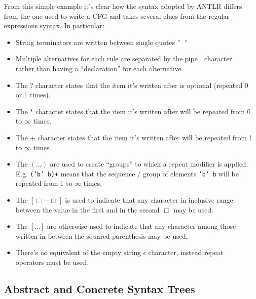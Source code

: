 \documentclass[]{usiinfbachelorproject}
\begin{document}
From this simple example it's clear how the syntax adopted by ANTLR
differs from the one used to write a CFG and takes several clues from the
regular expressions syntax. In particular:

\begin{itemize}
\item String terminators are written between single quotes \texttt{' '}
\item Multiple alternatives for each rule are separated by the pipe
      $ \mid $ character rather than having a ``declaration'' for each
      alternative.
\item The $ ? $ character states that the item it's written after is optional
      (repeated 0 or 1 times).
\item The $ * $ character states that the item it's written after will be
      repeated from 0 to $ \infty $ times.
\item The $ + $ character states that the item it's written after will be
      repeated from 1 to $ \infty $ times.
\item The $ \left( \hdots \right) $ are used to create ``groups'' to which
      a repeat modifier is applied. E.g. \texttt{('b' b)+} means that the
      sequence / group of elements \texttt{'b' b} will be repeated from 1
      to $ \infty $ times.
\item The $ \left[\Box-\Box\right] $ is used to indicate that any character in
      inclusive range between the value in the first and in the second $ \Box $
      may be used.
\item The $ \left[ \hdots \right] $ are otherwise used to indicate that any
      character among those written in between the squared parenthesis may
      be used.
\item There's no equivalent of the empty string $ \epsilon $ character, instead
      repeat operators must be used.
\end{itemize}

\subsection*{Abstract and Concrete Syntax Trees}
\end{document}
